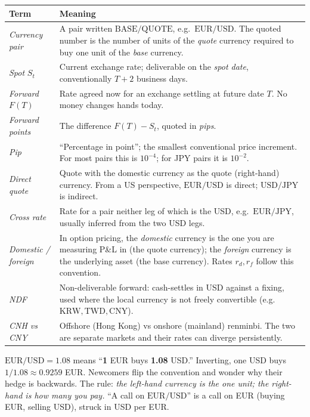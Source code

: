 \begin{keyfactbox}
\label{fact:fx_jargon}
\begin{tabular}{@{}p{} p{}@{}}
\toprule
\textbf{Term} & \textbf{Meaning} \\
\midrule
\emph{Currency pair} & A pair written $\mathrm{BASE}/\mathrm{QUOTE}$,
  e.g.\ $\mathrm{EUR}/\mathrm{USD}$.  The quoted number is the number
  of units of the \emph{quote} currency required to buy one unit of
  the \emph{base} currency. \\
\emph{Spot} $S_t$ & Current exchange rate; deliverable on the
  \emph{spot date}, conventionally $T+2$ business days. \\
\emph{Forward} $F(T)$ & Rate agreed now for an exchange settling at
  future date $T$.  No money changes hands today. \\
\emph{Forward points} & The difference $F(T) - S_t$, quoted in
  \emph{pips}. \\
\emph{Pip} & ``Percentage in point''; the smallest conventional
  price increment.  For most pairs this is $10^{-4}$; for JPY pairs it
  is $10^{-2}$. \\
\emph{Direct quote} & Quote with the domestic currency as the quote
  (right-hand) currency.  From a US perspective, $\mathrm{EUR}/\mathrm{USD}$
  is direct; $\mathrm{USD}/\mathrm{JPY}$ is indirect. \\
\emph{Cross rate} & Rate for a pair neither leg of which is the USD,
  e.g.\ $\mathrm{EUR}/\mathrm{JPY}$, usually inferred from the two
  USD legs. \\
\emph{Domestic / foreign} & In option pricing, the \emph{domestic}
  currency is the one you are measuring P\&L in (the quote currency);
  the \emph{foreign} currency is the underlying asset (the base
  currency).  Rates $r_d, r_f$ follow this convention. \\
\emph{NDF} & Non-deliverable forward: cash-settles in USD against a
  fixing, used where the local currency is not freely convertible
  (e.g.\ $\mathrm{KRW}, \mathrm{TWD}, \mathrm{CNY}$). \\
\emph{CNH vs CNY} & Offshore (Hong Kong) vs onshore (mainland)
  renminbi.  The two are separate markets and their rates can
  diverge persistently. \\
\bottomrule
\end{tabular}
\end{keyfactbox}

\begin{pitfallbox}
$\mathrm{EUR}/\mathrm{USD} = 1.08$ means
``\textbf{1} EUR buys \textbf{1.08} USD.''  Inverting, one USD buys
$1/1.08 \approx 0.9259$ EUR.  Newcomers flip the convention and
wonder why their hedge is backwards.  The rule:
\emph{the left-hand currency is the one unit; the right-hand is
how many you pay.}  ``A call on $\mathrm{EUR}/\mathrm{USD}$'' is a
call on EUR (buying EUR, selling USD), struck in USD per EUR.
\end{pitfallbox}

